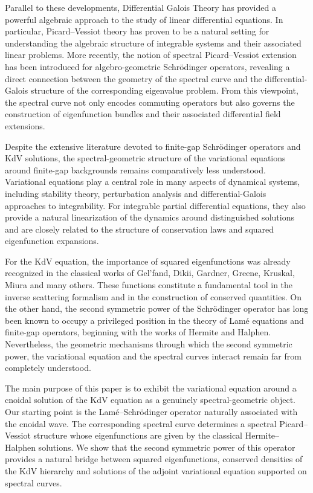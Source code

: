 \documentclass[a4paper,12pt]{article}
\begin{document}
Parallel to these developments, Differential Galois Theory has provided a powerful algebraic approach to the study of linear differential equations. In particular, Picard–Vessiot theory has proven to be a natural setting for understanding the algebraic structure of integrable systems and their associated linear problems. More recently, the notion of spectral Picard–Vessiot extension has been introduced for algebro-geometric Schrödinger operators, revealing a direct connection between the geometry of the spectral curve and the differential-Galois structure of the corresponding eigenvalue problem. From this viewpoint, the spectral curve not only encodes commuting operators but also governs the construction of eigenfunction bundles and their associated differential field extensions.

Despite the extensive literature devoted to finite-gap Schrödinger operators and KdV solutions, the spectral-geometric structure of the variational equations around finite-gap backgrounds remains comparatively less understood. Variational equations play a central role in many aspects of dynamical systems, including stability theory, perturbation analysis and differential-Galois approaches to integrability. For integrable partial differential equations, they also provide a natural linearization of the dynamics around distinguished solutions and are closely related to the structure of conservation laws and squared eigenfunction expansions.

For the KdV equation, the importance of squared eigenfunctions was already recognized in the classical works of Gel'fand, Dikii, Gardner, Greene, Kruskal, Miura and many others. These functions constitute a fundamental tool in the inverse scattering formalism and in the construction of conserved quantities. On the other hand, the second symmetric power of the Schrödinger operator has long been known to occupy a privileged position in the theory of Lamé equations and finite-gap operators, beginning with the works of Hermite and Halphen. Nevertheless, the geometric mechanisms through which the second symmetric power, the variational equation and the spectral curves interact remain far from completely understood.

The main purpose of this paper is to exhibit the variational equation around a cnoidal solution of the KdV equation as a genuinely spectral-geometric object. Our starting point is the Lamé–Schrödinger operator naturally associated with the cnoidal wave. The corresponding spectral curve determines a spectral Picard–Vessiot structure whose eigenfunctions are given by the classical Hermite–Halphen solutions. We show that the second symmetric power of this operator provides a natural bridge between squared eigenfunctions, conserved densities of the KdV hierarchy and solutions of the adjoint variational equation supported on spectral curves.
\end{document}
